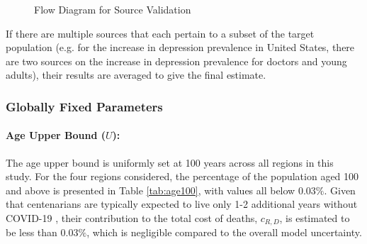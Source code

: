 \documentclass[msom,blindrev]{informs3} %
\begin{document}
\begin{APPENDICES}
\begin{figure}[htbp!]
{
}
\caption{Flow Diagram for Source Validation}
\end{figure}

If there are multiple sources that each pertain to a subset of the target population (e.g. for the increase in depression prevalence in United States, there are two sources on the increase in depression prevalence for doctors and young adults), their results are averaged to give the final estimate.

\subsubsection{Globally Fixed Parameters}

\paragraph{Age Upper Bound ($U$):} The age upper bound is uniformly set at 100 years across all regions in this study. For the four regions considered, the percentage of the population aged 100 and above is presented in Table \ref{tab:age100}, with values all below $0.03\%$. Given that centenarians are typically expected to live only 1-2 additional years without COVID-19 , their contribution to the total cost of deaths, $c_{R,D}$, is estimated to be less than $0.03\%$, which is negligible compared to the overall model uncertainty.


\end{APPENDICES}
\end{document}
